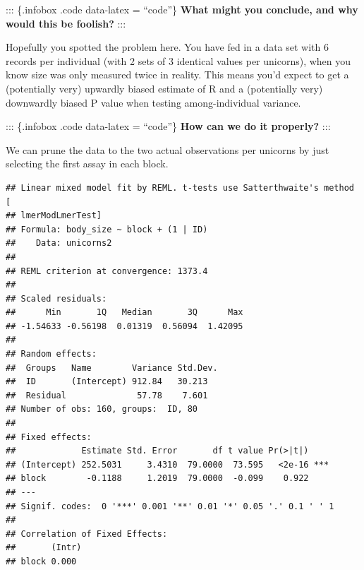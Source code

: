 \documentclass[
  12pt,
]{book}
\newenvironment{Shaded}{\begin{snugshade}}{\end{snugshade}}
\newcommand{\DataTypeTok}[1]{\textcolor[rgb]{0.13,0.29,0.53}{#1}}
\newcommand{\DecValTok}[1]{\textcolor[rgb]{0.00,0.00,0.81}{#1}}
\newcommand{\KeywordTok}[1]{\textcolor[rgb]{0.13,0.29,0.53}{\textbf{#1}}}
\newcommand{\NormalTok}[1]{#1}
\newcommand{\OperatorTok}[1]{\textcolor[rgb]{0.81,0.36,0.00}{\textbf{#1}}}
\newcommand{\StringTok}[1]{\textcolor[rgb]{0.31,0.60,0.02}{#1}}
\begin{document}
::: \{.infobox .code data-latex = ``code''\}
\textbf{What might you conclude, and why would this be foolish?}
:::

Hopefully you spotted the problem here. You have fed in a data set with 6 records per individual (with 2 sets of 3 identical values per unicorns), when you know size was only measured twice in reality. This means you'd expect to get a (potentially very) upwardly biased estimate of R and a (potentially very) downwardly biased P value when testing among-individual variance.

::: \{.infobox .code data-latex = ``code''\}
\textbf{How can we do it properly?}
:::

We can prune the data to the two actual observations per unicorns by just selecting the first assay in each block.

\begin{Shaded}
\end{Shaded}

\begin{verbatim}
## Linear mixed model fit by REML. t-tests use Satterthwaite's method [
## lmerModLmerTest]
## Formula: body_size ~ block + (1 | ID)
##    Data: unicorns2
## 
## REML criterion at convergence: 1373.4
## 
## Scaled residuals: 
##      Min       1Q   Median       3Q      Max 
## -1.54633 -0.56198  0.01319  0.56094  1.42095 
## 
## Random effects:
##  Groups   Name        Variance Std.Dev.
##  ID       (Intercept) 912.84   30.213  
##  Residual              57.78    7.601  
## Number of obs: 160, groups:  ID, 80
## 
## Fixed effects:
##             Estimate Std. Error       df t value Pr(>|t|)    
## (Intercept) 252.5031     3.4310  79.0000  73.595   <2e-16 ***
## block        -0.1188     1.2019  79.0000  -0.099    0.922    
## ---
## Signif. codes:  0 '***' 0.001 '**' 0.01 '*' 0.05 '.' 0.1 ' ' 1
## 
## Correlation of Fixed Effects:
##       (Intr)
## block 0.000
\end{verbatim}
\end{document}
